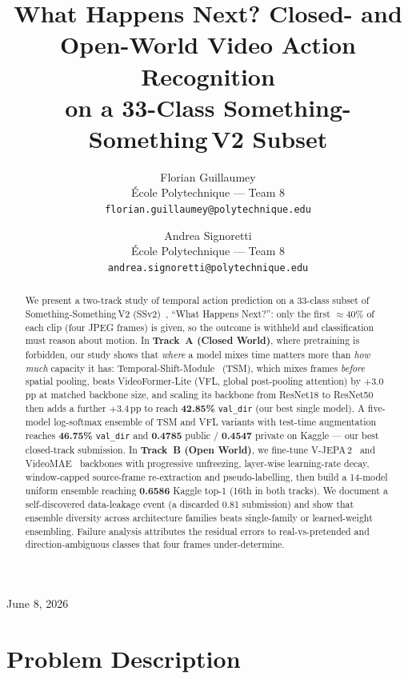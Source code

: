 \documentclass[10pt,twocolumn,letterpaper]{article}
\title{What Happens Next? Closed- and Open-World Video Action Recognition\\
on a 33-Class Something-Something\,V2 Subset}
\author{%
Florian Guillaumey\\
École Polytechnique --- Team 8\\
{\tt\small florian.guillaumey@polytechnique.edu}
\and
Andrea Signoretti\\
École Polytechnique --- Team 8\\
{\tt\small andrea.signoretti@polytechnique.edu}
}
\begin{document}
\maketitle
\thispagestyle{plain}
\pagestyle{plain}
\vspace{-1.2em}
\begin{center}\small June 8, 2026\end{center}

\begin{abstract}
We present a two-track study of temporal action prediction on a 33-class subset
of Something-Something\,V2 (SSv2)~\cite{goyal2017ssv2}, ``What Happens Next?'':
only the first ${\approx}40\%$ of each clip (four JPEG frames) is given, so the
outcome is withheld and classification must reason about motion. In
\textbf{Track~A (Closed World)}, where pretraining is forbidden, our study shows that
\emph{where} a model mixes time matters more than \emph{how much} capacity it
has: Temporal-Shift-Module~\cite{lin2019tsm} (TSM), which mixes frames
\emph{before} spatial pooling, beats VideoFormer-Lite (VFL, global
post-pooling attention) by $+3.0$\,pp at matched backbone size, and scaling
its backbone from ResNet18 to ResNet50 then adds a further $+3.4$\,pp to reach
\textbf{42.85\%} \texttt{val\_dir} (our best single model). A five-model
log-softmax ensemble of TSM and VFL variants with test-time augmentation
reaches \textbf{46.75\%} \texttt{val\_dir} and \textbf{0.4785} public /
\textbf{0.4547} private on Kaggle --- our best closed-track submission. In
\textbf{Track~B (Open World)}, we fine-tune V-JEPA\,2~\cite{bardes2025vjepa2}
and VideoMAE~\cite{tong2022videomae} backbones with progressive unfreezing,
layer-wise learning-rate decay, window-capped source-frame re-extraction and
pseudo-labelling, then build a 14-model uniform ensemble reaching
\textbf{0.6586} Kaggle top-1 (16th in both tracks). We document a
self-discovered data-leakage event (a discarded 0.81 submission) and show that
ensemble diversity across architecture families beats single-family or
learned-weight ensembling. Failure analysis attributes the residual errors to
real-vs-pretended and direction-ambiguous classes that four frames
under-determine.
\end{abstract}

\section{Problem Description}
\label{sec:problem}
\end{document}
